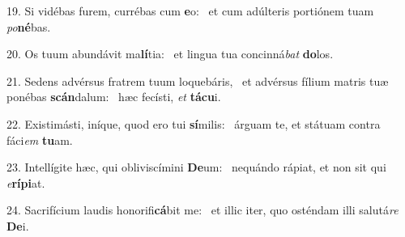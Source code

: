 19. Si vidébas furem, currébas cum \textbf{e}o: \ast\  et cum adúlteris portiónem tuam \textit{po}\textbf{né}bas.\

20. Os tuum abundávit ma\textbf{lí}tia: \ast\  et lingua tua concinná\textit{bat} \textbf{do}los.\

21. Sedens advérsus fratrem tuum loquebáris, \dag\  et advérsus fílium matris tuæ ponébas \textbf{scán}dalum: \ast\  hæc fecísti, \textit{et} \textbf{tá}\textbf{cu}i.\

22. Existimásti, iníque, quod ero tui \textbf{sí}milis: \ast\  árguam te, et státuam contra fáci\textit{em} \textbf{tu}am.\

23. Intellígite hæc, qui obliviscímini \textbf{De}um: \ast\  nequándo rápiat, et non sit qui \textit{e}\textbf{rí}\textbf{pi}at.\

24. Sacrifícium laudis honorifi\textbf{cá}bit me: \ast\  et illic iter, quo osténdam illi salutá\textit{re} \textbf{De}i.\

